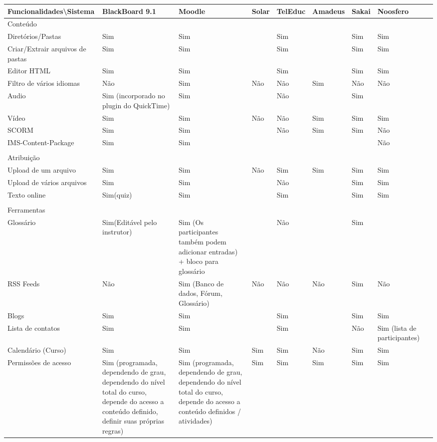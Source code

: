 \begin{table}[!htb]
\center
\begin{tabular}{@{}lllllllll@{}}
\toprule
Funcionalidades\textbackslash Sistema & BlackBoard 9.1 & Moodle & Solar & TelEduc & Amadeus & Sakai & Noosfero &  \\ \midrule
Conteúdo &  &  &  &  &  &  &  &  \\
Diretórios/Pastas & Sim & Sim &  & Sim &  & Sim & Sim &  \\
Criar/Extrair arquivos de pastas & Sim & Sim &  & Sim &  & Sim & Sim &  \\
Editor HTML & Sim & Sim &  & Sim &  & Sim & Sim &  \\
Filtro de vários idiomas & Não & Sim & Não & Não & Sim & Não & Não &  \\
Audio & Sim (incorporado no plugin do QuickTime) & Sim &  & Não &  & Sim &  &  \\
Vídeo & Sim & Sim & Não & Não & Sim & Sim & Sim &  \\
SCORM & Sim & Sim &  & Não & Sim & Sim & Não &  \\
IMS-Content-Package & Sim & Sim &  &  &  &  & Não &  \\
 &  &  &  &  &  &  &  &  \\
Atribuição &  &  &  &  &  &  &  &  \\
Upload de um arquivo & Sim & Sim & Não & Sim & Sim & Sim & Sim &  \\
Upload de vários arquivos & Sim & Sim &  & Não &  & Sim & Sim &  \\
Texto online & Sim(quiz) & Sim &  & Sim &  & Sim & Sim &  \\
 &  &  &  &  &  &  &  &  \\
Ferramentas &  &  &  &  &  &  &  &  \\
Glossário & Sim(Editável pelo instrutor) & Sim (Os participantes também podem adicionar entradas) + bloco para glossário &  & Não &  & Sim &  &  \\
RSS Feeds & Não & Sim (Banco de dados, Fórum, Glossário) & Não & Não & Não & Sim & Não &  \\
Blogs & Sim & Sim &  & Sim &  & Sim & Sim &  \\
Lista de contatos & Sim & Sim &  & Sim &  & Não & Sim (lista de participantes) &  \\
Calendário (Curso) & Sim & Sim & Sim & Sim & Não & Sim & Sim &  \\
Permissões de acesso & Sim (programada, dependendo de grau, dependendo do nível total do curso, depende do acesso a conteúdo definido, definir suas próprias regras) & Sim (programada, dependendo de grau, dependendo do nível total do curso, depende do acesso a conteúdo definidos / atividades) & Sim & Sim & Sim & Sim & Sim &  \\

\end{tabular}
\end{table}
